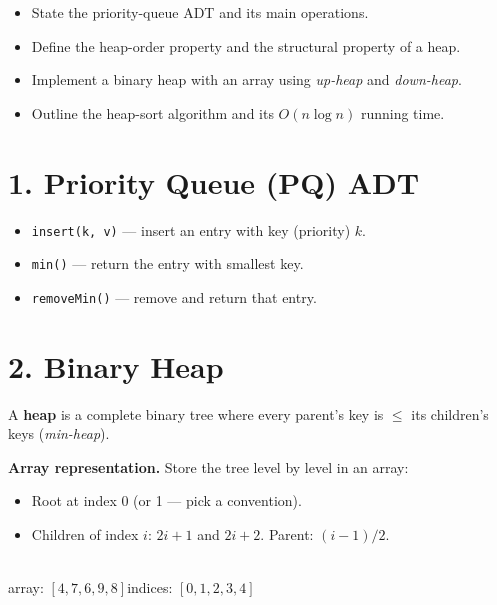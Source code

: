 \documentclass[11pt]{article}
\begin{document}

\begin{objbox}
\begin{itemize}[leftmargin=*]
  \item State the priority-queue ADT and its main operations.
  \item Define the heap-order property and the structural property of a heap.
  \item Implement a binary heap with an array using \emph{up-heap} and \emph{down-heap}.
  \item Outline the heap-sort algorithm and its $O(n\log n)$ running time.
\end{itemize}
\end{objbox}

\section*{1. Priority Queue (PQ) ADT}

\begin{itemize}[leftmargin=*]
  \item \texttt{insert(k, v)} --- insert an entry with key (priority) $k$.
  \item \texttt{min()} --- return the entry with smallest key.
  \item \texttt{removeMin()} --- remove and return that entry.
\end{itemize}

\section*{2. Binary Heap}

A \textbf{heap} is a complete binary tree where every parent's key is $\leq$ its children's keys (\emph{min-heap}).

\textbf{Array representation.} Store the tree level by level in an array:
\begin{itemize}[leftmargin=*]
  \item Root at index 0 (or 1 --- pick a convention).
  \item Children of index $i$: $2i+1$ and $2i+2$. Parent: $(i-1)/2$.
\end{itemize}

\begin{center}
\\[2pt]
{\small array: $[4, 7, 6, 9, 8]$\quad indices: $[0, 1, 2, 3, 4]$}
\end{center}
\end{document}

